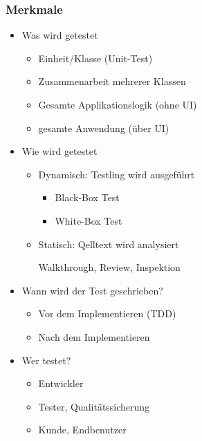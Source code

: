 \documentclass[../ZF_SWEN1.tex]{subfiles}
\begin{document}
\subsubsection{Merkmale}
\begin{itemize}
	\item Was wird getestet
	\begin{itemize}
		\item Einheit/Klasse (Unit-Test)
		\item Zusammenarbeit mehrerer Klassen
		\item Gesamte Applikationslogik (ohne UI)
		\item gesamte Anwendung (über UI)
	\end{itemize}
	\item Wie wird getestet
	\begin{itemize}
		\item Dynamisch: Testling wird ausgeführt
		\begin{itemize}
			\item Black-Box Test
			\item White-Box Test
		\end{itemize}
		\item Statisch: Qelltext wird analysiert
		\begin{itemize}
			\itlem Walkthrough, Review, Inspektion
		\end{itemize}
	\end{itemize}
	\item Wann wird der Test geschrieben?
	\begin{itemize}
		\item Vor dem Implementieren (TDD)
		\item Nach dem Implementieren
	\end{itemize}
	\item Wer testet?
	\begin{itemize}
		\item Entwickler
		\item Tester, Qualitätssicherung
		\item Kunde, Endbenutzer
	\end{itemize}
\end{itemize}
\end{document}
